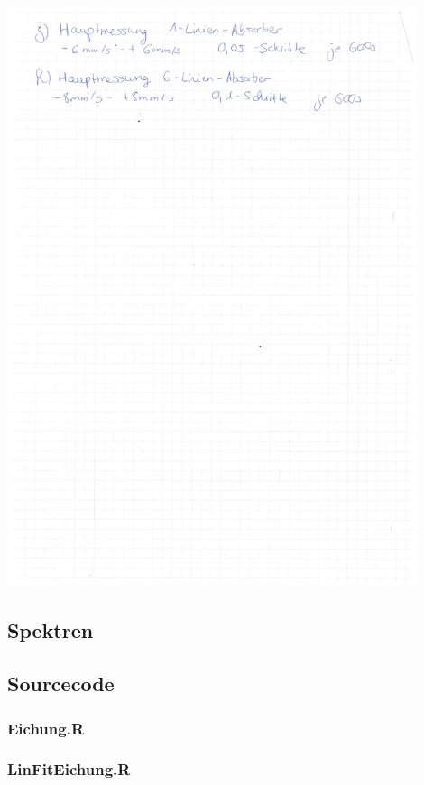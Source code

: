 \begin{minipage}{\textwidth}
	\centering
	\includegraphics[width=0.9\textwidth]{../figures/laborbuch2.pdf}
\end{minipage}

\subsection{Spektren}
\label{spektren}

\subsection{Sourcecode}
\label{code}
\subsubsection*{Eichung.R}\label{Energieeichung}


\subsubsection*{LinFitEichung.R}\label{LinFitEichung}



